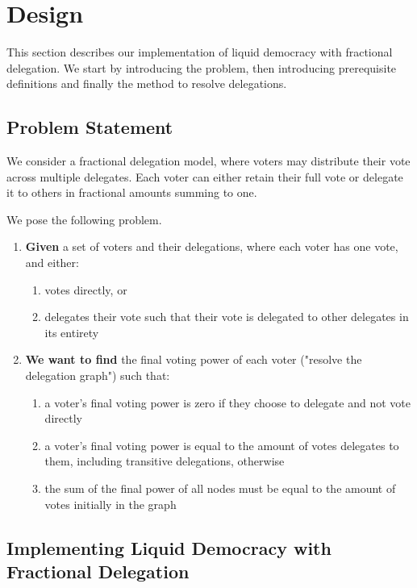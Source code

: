 \graphicspath{ {./figures/} }

\chapter{Design}
\label{chap:design}

This section describes our implementation of liquid democracy with fractional delegation. We start by introducing the problem, then introducing prerequisite definitions and finally the method to resolve delegations. 

\section{Problem Statement}

We consider a fractional delegation model, where voters may distribute their vote across multiple  delegates. Each voter can either retain their full vote or delegate it to others in fractional amounts summing to one.

We pose the following problem.

\begin{enumerate}
\item \textbf{Given} a set of voters and their delegations, where each voter has one vote, and either:
\begin{enumerate}
\item votes directly, or 
\item delegates their vote such that their vote is delegated to other delegates in its entirety
\end{enumerate}
\item \textbf{We want to find} the final voting power of each voter ("resolve the delegation graph") such that:
\begin{enumerate}
\item a voter's final voting power is zero if they choose to delegate and not vote directly 
\item a voter's final voting power is equal to the amount of votes delegates to them, including transitive delegations, otherwise
\item the sum of the final power of all nodes must be equal to the amount of votes initially in the graph
\end{enumerate}
\end{enumerate}

\section{Implementing Liquid Democracy with Fractional Delegation}
\label{sec:ld_with_frac_del}

